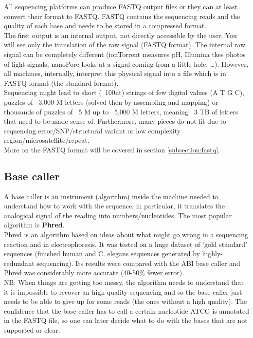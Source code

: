 \begin{description}
All sequencing platforms can produce FASTQ output files or they can at least convert their format to FASTQ. FASTQ contains the sequencing reads and the quality of each base and needs to be stored in a compressed format.\\
The first output is an internal output, not directly accessible by the user. You will see only the translation of the raw signal (FASTQ format). The internal raw signal can be completely different (ionTorrent measures pH, Illumina tkes photos of light signals, nanoPore looks at a signal coming from a little hole, …). However, all machines, internally, interpret this physical signal into a file which is in FASTQ format (the standard format). 
\\
Sequencing might lead to short (~100nt) strings of few digital values (A T G C), puzzles of ~3,000 M letters (solved then by assembling and mapping) or thousands of puzzles of ~5 M up to ~5,000 M letters, meaning ~3 TB of letters that need to be made sense of. Furthermore, many pieces do not fit due to sequencing error/SNP/structural variant or low complexity region/microsatellite/repeat.
\\
More on the FASTQ format will be covered in section \ref{subsection:fastq}.
\subsection{Base caller}
A base caller is an instrument (algorithm) inside the machine needed to understand how to work with the sequence, in particular, it translates the analogical signal of the reading into numbers/nucleotides. The most popular algorithm is \textbf{Phred}.
\\
Phred is an algorithm based on ideas about what might go wrong in a sequencing reaction and in electrophoresis. It was tested on a huge dataset of ‘gold standard’ sequences (finished human and C. elegans sequences generated by highly-redundant sequencing). Its results were compared with the ABI base caller and Phred was considerably more accurate (40-50\% fewer error). \\
NB: When things are getting too messy, the algorithm needs to understand that it is impossible to recover an high quality sequencing and so the base caller just needs to be able to give up for some reads (the ones without a high quality). The confidence that the base caller has to call a certain nucleotide ATCG is annotated in the FASTQ file, so one can later decide what to do with the bases that are not supported or clear.


\end{description}

